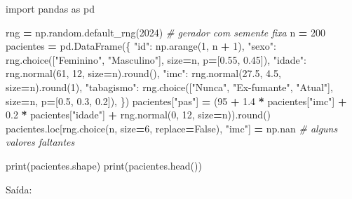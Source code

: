 \documentclass[
]{book}
\newenvironment{Shaded}{\begin{snugshade}}{\end{snugshade}}
\newcommand{\BuiltInTok}[1]{#1}
\newcommand{\CommentTok}[1]{\textcolor[rgb]{0.56,0.35,0.01}{\textit{#1}}}
\newcommand{\DecValTok}[1]{\textcolor[rgb]{0.00,0.00,0.81}{#1}}
\newcommand{\FloatTok}[1]{\textcolor[rgb]{0.00,0.00,0.81}{#1}}
\newcommand{\ImportTok}[1]{#1}
\newcommand{\NormalTok}[1]{#1}
\newcommand{\OperatorTok}[1]{\textcolor[rgb]{0.81,0.36,0.00}{\textbf{#1}}}
\newcommand{\StringTok}[1]{\textcolor[rgb]{0.31,0.60,0.02}{#1}}
\newcommand{\VariableTok}[1]{\textcolor[rgb]{0.00,0.00,0.00}{#1}}
\begin{document}
\begin{Shaded}
\begin{Highlighting}[]
\ImportTok{import}\NormalTok{ pandas }\ImportTok{as}\NormalTok{ pd}

\NormalTok{rng }\OperatorTok{=}\NormalTok{ np.random.default\_rng(}\DecValTok{2024}\NormalTok{)        }\CommentTok{\# gerador com semente fixa}
\NormalTok{n }\OperatorTok{=} \DecValTok{200}
\NormalTok{pacientes }\OperatorTok{=}\NormalTok{ pd.DataFrame(\{}
    \StringTok{"id"}\NormalTok{: np.arange(}\DecValTok{1}\NormalTok{, n }\OperatorTok{+} \DecValTok{1}\NormalTok{),}
    \StringTok{"sexo"}\NormalTok{: rng.choice([}\StringTok{"Feminino"}\NormalTok{, }\StringTok{"Masculino"}\NormalTok{], size}\OperatorTok{=}\NormalTok{n, p}\OperatorTok{=}\NormalTok{[}\FloatTok{0.55}\NormalTok{, }\FloatTok{0.45}\NormalTok{]),}
    \StringTok{"idade"}\NormalTok{: rng.normal(}\DecValTok{61}\NormalTok{, }\DecValTok{12}\NormalTok{, size}\OperatorTok{=}\NormalTok{n).}\BuiltInTok{round}\NormalTok{(),}
    \StringTok{"imc"}\NormalTok{: rng.normal(}\FloatTok{27.5}\NormalTok{, }\FloatTok{4.5}\NormalTok{, size}\OperatorTok{=}\NormalTok{n).}\BuiltInTok{round}\NormalTok{(}\DecValTok{1}\NormalTok{),}
    \StringTok{"tabagismo"}\NormalTok{: rng.choice([}\StringTok{"Nunca"}\NormalTok{, }\StringTok{"Ex{-}fumante"}\NormalTok{, }\StringTok{"Atual"}\NormalTok{], size}\OperatorTok{=}\NormalTok{n, p}\OperatorTok{=}\NormalTok{[}\FloatTok{0.5}\NormalTok{, }\FloatTok{0.3}\NormalTok{, }\FloatTok{0.2}\NormalTok{]),}
\NormalTok{\})}
\NormalTok{pacientes[}\StringTok{"pas"}\NormalTok{] }\OperatorTok{=}\NormalTok{ (}\DecValTok{95} \OperatorTok{+} \FloatTok{1.4} \OperatorTok{*}\NormalTok{ pacientes[}\StringTok{"imc"}\NormalTok{] }\OperatorTok{+} \FloatTok{0.2} \OperatorTok{*}\NormalTok{ pacientes[}\StringTok{"idade"}\NormalTok{]}
                    \OperatorTok{+}\NormalTok{ rng.normal(}\DecValTok{0}\NormalTok{, }\DecValTok{12}\NormalTok{, size}\OperatorTok{=}\NormalTok{n)).}\BuiltInTok{round}\NormalTok{()}
\NormalTok{pacientes.loc[rng.choice(n, size}\OperatorTok{=}\DecValTok{6}\NormalTok{, replace}\OperatorTok{=}\VariableTok{False}\NormalTok{), }\StringTok{"imc"}\NormalTok{] }\OperatorTok{=}\NormalTok{ np.nan   }\CommentTok{\# alguns valores faltantes}

\BuiltInTok{print}\NormalTok{(pacientes.shape)}
\BuiltInTok{print}\NormalTok{(pacientes.head())}
\end{Highlighting}
\end{Shaded}

Saída:
\end{document}

